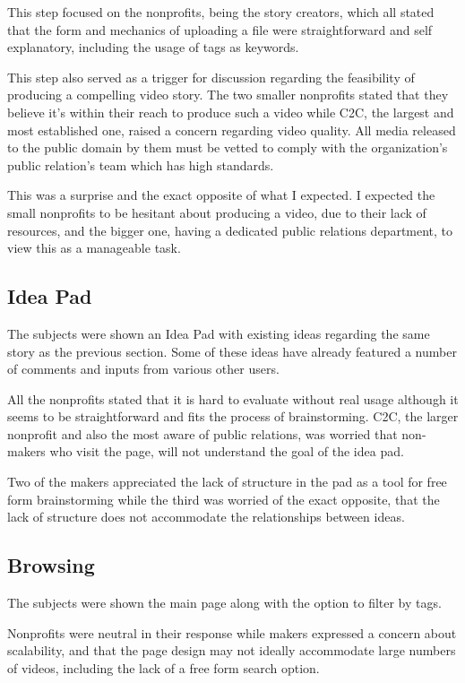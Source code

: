 This step focused on the nonprofits, being the story creators, which all stated that the form and mechanics of uploading a file were straightforward and self explanatory, including the usage of tags as keywords. 

This step also served as a trigger for discussion regarding the feasibility of producing a compelling video story. The two smaller nonprofits stated that they believe it's within their reach to produce such a video while C2C, the largest and most established one, raised a concern regarding video quality. All media released to the public domain by them must be vetted to comply with the organization's public relation's team which has high standards.

This was a surprise and the exact opposite of what I expected. I expected the small nonprofits to be hesitant about producing a video, due to their lack of resources, and the bigger one, having a dedicated public relations department, to view this as a manageable task.

\subsection{Idea Pad}

The subjects were shown an Idea Pad with existing ideas regarding the same story as the previous section. Some of these ideas have already featured a number of comments and inputs from various other users.

All the nonprofits stated that it is hard to evaluate without real usage although it seems to be straightforward and fits the process of brainstorming. C2C, the larger nonprofit and also the most aware of public relations, was worried that non-makers who visit the page, will not understand the goal of the idea pad.   

Two of the makers appreciated the lack of structure in the pad as a tool for free form brainstorming while the third was worried of the exact opposite, that the lack of structure does not accommodate the relationships between ideas.

\subsection{Browsing}

The subjects were shown the main page along with the option to filter by tags.

Nonprofits were neutral in their response while makers expressed a concern about scalability, and that the page design may not ideally accommodate large numbers of videos, including the lack of a free form search option.

